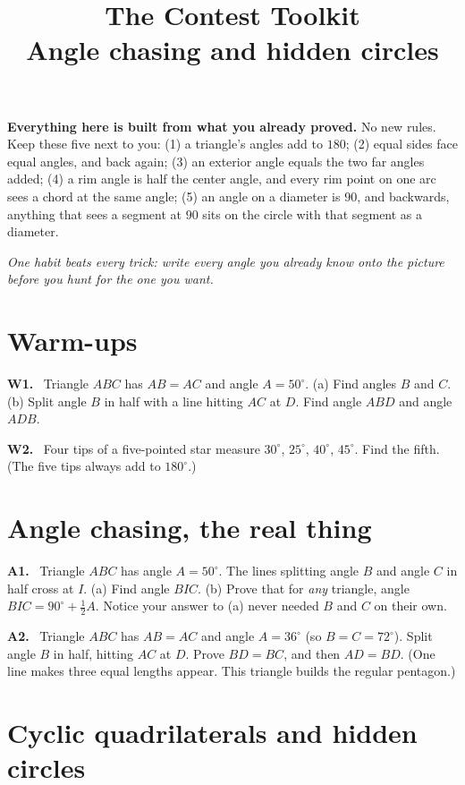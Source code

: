 \documentclass[11pt]{article}
\title{\vspace{-1.5cm}\textbf{The Contest Toolkit}\\[-2pt]
  \large Angle chasing and hidden circles}
\author{}
\date{}
\newcommand{\drawbox}[1]{%
  \par\vspace{4pt}\noindent
  \fbox{\rule{0pt}{#1}\rule{\dimexpr\linewidth-2\fboxsep-2\fboxrule}{0pt}}%
  \par\vspace{6pt}}
\newcommand{\prob}[1]{\par\medskip\noindent\textbf{\color{benblue}#1}\ \ignorespaces}
\begin{document}
\maketitle
\vspace{-1.2cm}

\noindent\textbf{Everything here is built from what you already proved.} No new
rules. Keep these five next to you: (1) a triangle's angles add to $180$;
(2) equal sides face equal angles, and back again; (3) an exterior angle equals
the two far angles added; (4) a rim angle is half the center angle, and every rim
point on one arc sees a chord at the same angle; (5) an angle on a diameter is
$90$, and backwards, anything that sees a segment at $90$ sits on the circle with
that segment as a diameter.

\medskip
\noindent\emph{One habit beats every trick: write every angle you already know
onto the picture before you hunt for the one you want.}

\section*{Warm-ups}

\prob{W1.} Triangle $ABC$ has $AB = AC$ and angle $A = 50^\circ$.
(a) Find angles $B$ and $C$. (b) Split angle $B$ in half with a line hitting $AC$
at $D$. Find angle $ABD$ and angle $ADB$.
\drawbox{2.6cm}

\prob{W2.} Four tips of a five-pointed star measure $30^\circ$, $25^\circ$,
$40^\circ$, $45^\circ$. Find the fifth. (The five tips always add to $180^\circ$.)
\drawbox{1.4cm}

\section*{Angle chasing, the real thing}

\prob{A1.} Triangle $ABC$ has angle $A = 50^\circ$. The lines splitting angle $B$
and angle $C$ in half cross at $I$. (a) Find angle $BIC$. (b) Prove that for
\emph{any} triangle, angle $BIC = 90^\circ + \tfrac{1}{2}A$. Notice your answer to
(a) never needed $B$ and $C$ on their own.
\drawbox{3cm}

\prob{A2.} Triangle $ABC$ has $AB = AC$ and angle $A = 36^\circ$ (so $B = C =
72^\circ$). Split angle $B$ in half, hitting $AC$ at $D$. Prove $BD = BC$, and then
$AD = BD$. (One line makes three equal lengths appear. This triangle builds the
regular pentagon.)
\drawbox{3.4cm}

\section*{Cyclic quadrilaterals and hidden circles}
\end{document}
